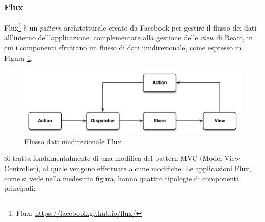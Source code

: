 \subsubsection{Flux}\label{sec:flux}

Flux\footnote{Flux: \url{https://facebook.github.io/flux/}} è un \emph{pattern} architetturale creato da Facebook per gestire il flusso dei dati all'interno dell'applicazione. \upe complementare alla gestione delle \emph{view} di React, in cui i componenti sfruttano un flusso di dati unidirezionale, come espresso in Figura \ref{fig:flux}.

\begin{figure}[ht]
	\centering
	\includegraphics[width=\textwidth]{2-preliminari/Immagini/flux.pdf}
	\caption{Flusso dati unidirezionale Flux}\label{fig:flux}
\end{figure}

Si tratta fondamentalmente di una modifica del pattern MVC (Model View Controller), al quale vengono effettuate alcune modifiche.
Le applicazioni Flux, come si vede nella medesima figura, hanno quattro tipologie di componenti principali:

